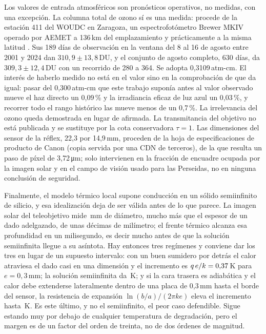 \documentclass[10pt,a4paper]{article}
\begin{document}
Los valores de entrada atmosféricos son pronósticos operativos, no medidas, con
una excepción. La columna total de ozono sí es una medida: procede de la estación
411 del WOUDC en Zaragoza, un espectrofotómetro Brewer MKIV operado por AEMET a
136\,km del emplazamiento y prácticamente a la misma latitud \cite{woudc}. Sus
189 días de observación en la ventana del 8 al 16 de agosto entre 2001 y 2024 dan
$310{,}9 \pm 13{,}8$\,DU, y el conjunto de agosto completo, 630 días, da
$309{,}3 \pm 12{,}4$\,DU con un recorrido de 280 a 364. Se adopta
0,3109\,atm-cm. El interés de haberlo medido no está en el valor sino en la
comprobación de que da igual: pasar del 0,300\,atm-cm que este trabajo suponía
antes al valor observado mueve el haz directo un 0,09\,\% y la irradiancia
eficaz de luz azul un 0,03\,\%, y recorrer todo el rango histórico las mueve
menos de un 0,7\,\%. La irrelevancia del ozono queda demostrada en lugar de
afirmada. La transmitancia del
objetivo no está publicada y se sustituye por la cota conservadora $\tau = 1$.
Las dimensiones del sensor de la réflex, 22,3 por 14,9\,mm, proceden de la hoja
de especificaciones de producto de Canon (copia servida por una CDN de terceros), de la que resulta un paso de píxel de
3,72\,\si{\micro\meter}; solo intervienen en la fracción de encuadre ocupada por
la imagen solar y en el campo de visión usado para las Perseidas, no en ninguna
conclusión de seguridad.

Finalmente, el modelo térmico local supone conducción en un sólido semiinfinito
de silicio, y esa idealización deja de ser válida antes de lo que parece. La
imagen solar del teleobjetivo mide \imgDiaThreeZeroZero\,mm de diámetro, mucho
más que el espesor de un dado adelgazado, de unas décimas de milímetro; el
frente térmico alcanza esa profundidad en un milisegundo, es decir mucho antes
de que la solución semiinfinita llegue a su asíntota. Hay entonces tres regímenes
y conviene dar los tres en lugar de un supuesto intervalo:
con un buen sumidero por detrás el calor atraviesa el dado casi en una dimensión
y el incremento es $q\,e/k = 0{,}37$\,K para $e = 0{,}3$\,mm; la
solución semiinfinita da \dTssThreeZeroZero\,K; y si la cara trasera es
adiabática y el calor debe extenderse lateralmente dentro de una placa de
0,3\,mm hasta el borde del sensor, la resistencia de expansión
$\ln(b/a)/(2\pi k e)$ eleva el incremento hasta \dTworstThreeZeroZero\,K. Es
este último, y no el semiinfinito, el peor caso defendible. Sigue estando muy
por debajo de cualquier temperatura de degradación, pero el margen es de un
factor del orden de treinta, no de dos órdenes de magnitud.
\end{document}

